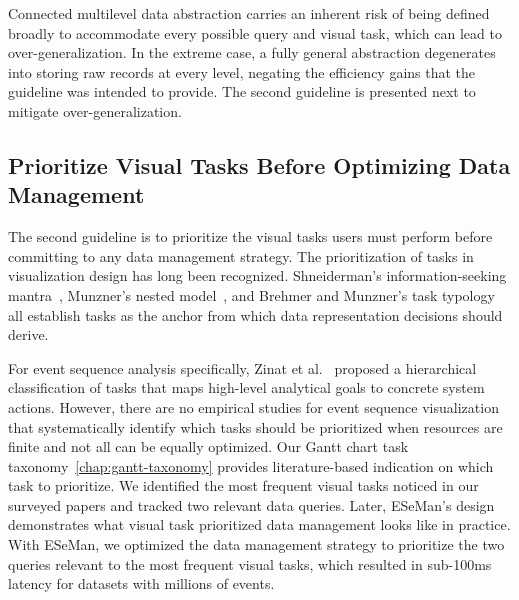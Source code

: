 \begin{refsection}
Connected multilevel data abstraction carries an inherent risk of being defined broadly to accommodate every possible query and visual task, which can lead to over-generalization. In the extreme case, a fully general abstraction degenerates into storing raw records at every level, negating the efficiency gains that the guideline was intended to provide. The second guideline is presented next to mitigate over-generalization.

\subsection{Prioritize Visual Tasks Before Optimizing Data Management}
\label{subsec:user_tasks}

The second guideline is to prioritize the visual tasks users must perform before committing to any data management strategy. The prioritization of tasks in visualization design has long been recognized. Shneiderman's information-seeking mantra~\cite{shneiderman2003eyes}, Munzner's nested model~\cite{munzner2009nested}, and Brehmer and Munzner's task typology~\cite{brehmer2013multi} all establish tasks 
as the anchor from which data representation decisions should derive.

For event sequence analysis specifically, Zinat et al.~\cite{zinat2024multi} proposed a hierarchical classification of tasks that maps high-level analytical goals to concrete system actions. However, there are no empirical studies for event sequence visualization that systematically identify which tasks should be prioritized when resources are finite and not all can be equally optimized. Our Gantt chart task taxonomy~\autoref{chap:gantt-taxonomy} provides literature-based indication on which task to prioritize. We identified the most frequent visual tasks noticed in our surveyed papers and tracked two relevant data queries. Later, ESeMan's design demonstrates what visual task prioritized data management looks like in practice. With ESeMan, we optimized the data management strategy to prioritize the two queries relevant to the most frequent visual tasks, which resulted in sub-100ms latency for datasets with millions of events.


\end{refsection}
